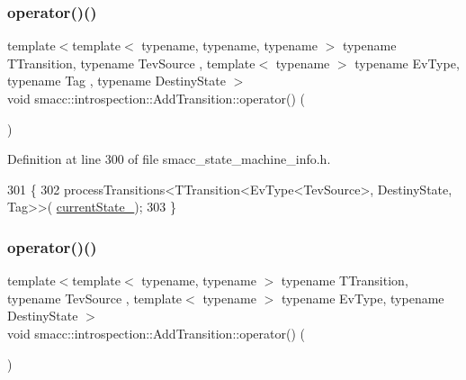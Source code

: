 \subsubsection{\texorpdfstring{operator()()}{operator()()}\hspace{0.1cm}{\footnotesize\ttfamily [1/4]}}
{\footnotesize\ttfamily template$<$template$<$ typename, typename, typename $>$ typename T\+Transition, typename Tev\+Source , template$<$ typename $>$ typename Ev\+Type, typename Tag , typename Destiny\+State $>$ \\
void smacc\+::introspection\+::\+Add\+Transition\+::operator() (\begin{DoxyParamCaption}\item[{T\+Transition$<$ Ev\+Type$<$ Tev\+Source $>$, Destiny\+State, Tag $>$}]{ }\end{DoxyParamCaption})}



Definition at line 300 of file smacc\+\_\+state\+\_\+machine\+\_\+info.\+h.


\begin{DoxyCode}
301 \{
302     processTransitions<TTransition<EvType<TevSource>, DestinyState, Tag>>(
      \hyperlink{structsmacc_1_1introspection_1_1AddTransition_a56fd9b1bdf6761bbe5258dc915481f4b}{currentState\_});
303 \}
\end{DoxyCode}
\mbox{\label{structsmacc_1_1introspection_1_1AddTransition_ae418fea0a96b2b2da60fb2f42a8c99cf}} 
\subsubsection{\texorpdfstring{operator()()}{operator()()}\hspace{0.1cm}{\footnotesize\ttfamily [2/4]}}
{\footnotesize\ttfamily template$<$template$<$ typename, typename $>$ typename T\+Transition, typename Tev\+Source , template$<$ typename $>$ typename Ev\+Type, typename Destiny\+State $>$ \\
void smacc\+::introspection\+::\+Add\+Transition\+::operator() (\begin{DoxyParamCaption}\item[{T\+Transition$<$ Ev\+Type$<$ Tev\+Source $>$, Destiny\+State $>$}]{ }\end{DoxyParamCaption})}



